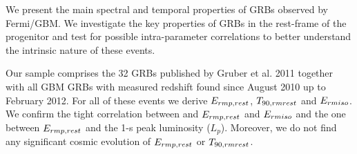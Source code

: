 


\bigskip



\bigskip

\noindent We present the main spectral and temporal properties of GRBs observed by Fermi/GBM. We investigate the key properties of GRBs in the rest-frame of the progenitor and test for possible intra-parameter correlations to better understand the intrinsic nature of these events.

Our sample comprises the 32 GRBs published by Gruber et al. 2011 together with all GBM GRBs with measured redshift found since August 2010 up to February 2012. For all of these events we derive $E_{\\rm p,rest}$, $T_{90,{\\rm rest}}$ and $E_{\\rm iso}$. We confirm the tight correlation between and $E_{\\rm p,rest}$ and $E_{\\rm iso}$ and the one between $E_{\\rm p,rest}$ and the 1-s peak luminosity ($L_p$). Moreover, we do not find any significant cosmic evolution of $E_{\\rm p,rest}$ or $T_{90,{\\rm rest}}$.

